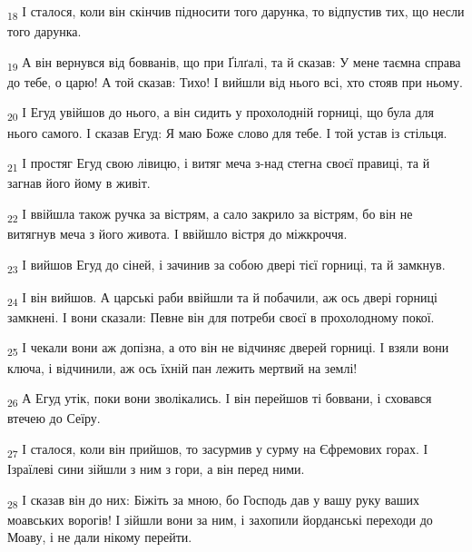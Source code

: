 \begin{tcolorbox}
\textsubscript{18} І сталося, коли він скінчив підносити того дарунка, то відпустив тих, що несли того дарунка.
\end{tcolorbox}
\begin{tcolorbox}
\textsubscript{19} А він вернувся від бовванів, що при Ґілґалі, та й сказав: У мене таємна справа до тебе, о царю! А той сказав: Тихо! І вийшли від нього всі, хто стояв при ньому.
\end{tcolorbox}
\begin{tcolorbox}
\textsubscript{20} І Егуд увійшов до нього, а він сидить у прохолодній горниці, що була для нього самого. І сказав Егуд: Я маю Боже слово для тебе. І той устав із стільця.
\end{tcolorbox}
\begin{tcolorbox}
\textsubscript{21} І простяг Егуд свою лівицю, і витяг меча з-над стегна своєї правиці, та й загнав його йому в живіт.
\end{tcolorbox}
\begin{tcolorbox}
\textsubscript{22} І ввійшла також ручка за вістрям, а сало закрило за вістрям, бо він не витягнув меча з його живота. І ввійшло вістря до міжкроччя.
\end{tcolorbox}
\begin{tcolorbox}
\textsubscript{23} І вийшов Егуд до сіней, і зачинив за собою двері тієї горниці, та й замкнув.
\end{tcolorbox}
\begin{tcolorbox}
\textsubscript{24} І він вийшов. А царські раби ввійшли та й побачили, аж ось двері горниці замкнені. І вони сказали: Певне він для потреби своєї в прохолодному покої.
\end{tcolorbox}
\begin{tcolorbox}
\textsubscript{25} І чекали вони аж допізна, а ото він не відчиняє дверей горниці. І взяли вони ключа, і відчинили, аж ось їхній пан лежить мертвий на землі!
\end{tcolorbox}
\begin{tcolorbox}
\textsubscript{26} А Егуд утік, поки вони зволікались. І він перейшов ті боввани, і сховався втечею до Сеїру.
\end{tcolorbox}
\begin{tcolorbox}
\textsubscript{27} І сталося, коли він прийшов, то засурмив у сурму на Єфремових горах. І Ізраїлеві сини зійшли з ним з гори, а він перед ними.
\end{tcolorbox}
\begin{tcolorbox}
\textsubscript{28} І сказав він до них: Біжіть за мною, бо Господь дав у вашу руку ваших моавських ворогів! І зійшли вони за ним, і захопили йорданські переходи до Моаву, і не дали нікому перейти.
\end{tcolorbox}
